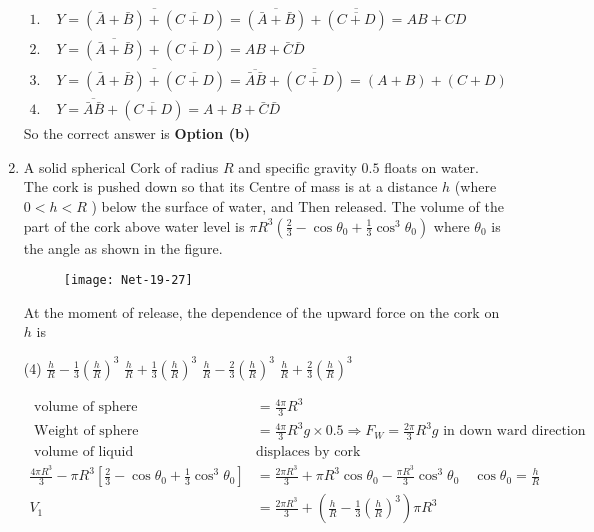 \begin{enumerate}
\begin{answer}
\begin{align*}
	\text{1. }&Y=\overline{(\bar{A}+\bar{B})+(\overline{C+D})}=\overline{(\bar{A}+\bar{B})}+\overline{(\overline{C+D})}=A B+C D\\
		\text{2. }&Y=\overline{(\bar{A}+\bar{B})}+(\overline{C+D})=A B+\bar{C} \bar{D}\\
		\text{3. }&Y=\overline{(\bar{A}+\bar{B})+(\overline{C+D})}=\overline{\bar{A} \bar{B}}+\overline{(\overline{C+D})}=(A+B)+(C+D)\\
		\text{4. }&Y=\overline{\bar{A} \bar{B}}+(\overline{C+D})=A+B+\bar{C} \bar{D}
	\end{align*}
		So the correct answer is \textbf{Option (b)}
\end{answer}
\item  A solid spherical Cork of radius $R$ and specific gravity $0.5$ floats on water. The cork is pushed down so that its Centre of mass is at a distance $h$ (where $0<h<R$ ) below the surface of water, and Then released. The volume of the part of the cork above water level is $\pi R^{3}\left(\frac{2}{3}-\cos \theta_{0}+\frac{1}{3} \cos ^{3} \theta_{0}\right)$ where $\theta_{0}$ is the angle as shown in the figure.
\begin{figure}[H]
	\centering
	\texttt{[image: Net-19-27]}
\end{figure}
At the moment of release, the dependence of the upward force on the cork on $h$ is
 \begin{tasks}(4)
	\task[\textbf{a.}]$\frac{h}{R}-\frac{1}{3}\left(\frac{h}{R}\right)^{3}$
	\task[\textbf{b.}]$\frac{h}{R}+\frac{1}{3}\left(\frac{h}{R}\right)^{3}$
	\task[\textbf{c.}]$\frac{h}{R}-\frac{2}{3}\left(\frac{h}{R}\right)^{3}$
	\task[\textbf{d.}] $\frac{h}{R}+\frac{2}{3}\left(\frac{h}{R}\right)^{3}$
\end{tasks}
\begin{answer}
	\begin{align*}
	\text { volume of sphere }&=\frac{4 \pi}{3} R^{3}\\
	\text { Weight of sphere }&=\frac{4 \pi}{3} R^{3} g \times 0.5 \Rightarrow F_{W}=\frac{2 \pi}{3} R^{3} g \text { in down ward direction }\\
\text { volume of liquid }&\text{displaces by cork }\\
\frac{4 \pi R^{3}}{3}-\pi R^{3}\left[\frac{2}{3}-\cos \theta_{0}+\frac{1}{3} \cos ^{3} \theta_{0}\right]&=\frac{2 \pi R^{3}}{3}+\pi R^{3} \cos \theta_{0}-\frac{\pi R^{3}}{3} \cos ^{3} \theta_{0} \quad \cos \theta_{0}=\frac{h}{R}\\
V_{1}&=\frac{2 \pi R^{3}}{3}+\left(\frac{h}{R}-\frac{1}{3}\left(\frac{h}{R}\right)^{3}\right) \pi R^{3}\\

\end{align*}
\end{answer}
\end{enumerate}
